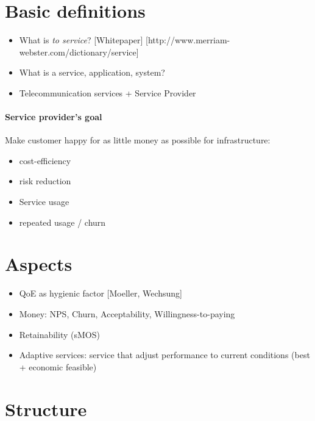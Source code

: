 \section{Basic definitions}
\begin{itemize}
\item What is \emph{to service}? [Whitepaper] [http://www.merriam-webster.com/dictionary/service]
\item What is a service, application, system?
\item Telecommunication services + Service Provider
\end{itemize}

\paragraph*{Service provider's goal}
Make customer happy for as little money as possible for infrastructure: 
\begin{itemize}
\item cost-efficiency
\item risk reduction
\item Service usage
\item repeated usage / churn
\end{itemize}

\section{Aspects}
\begin{itemize}
\item QoE as hygienic factor [Moeller, Wechsung]  
\item Money: NPS, Churn, Acceptability, Willingness-to-paying
\item Retainability (sMOS)
\item Adaptive services: service that adjust performance to current conditions (best + economic feasible)
\end{itemize}

\section{Structure}
